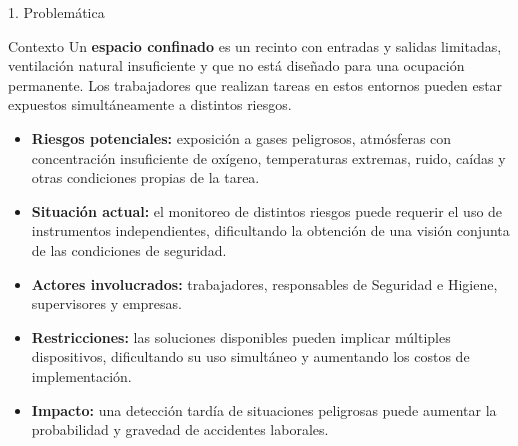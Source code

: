 \documentclass[10pt, aspectratio=169]{beamer}
\begin{document}
\begin{frame}{1. Problemática}

    \begin{block}{Contexto}
        Un \textbf{espacio confinado} es un recinto con entradas y salidas
        limitadas, ventilación natural insuficiente y que no está diseñado
        para una ocupación permanente. Los trabajadores que realizan tareas
        en estos entornos pueden estar expuestos simultáneamente a distintos
        riesgos.
    \end{block}

    \vspace{0.15cm}

    \begin{itemize}

        \item \textbf{Riesgos potenciales:}
        exposición a gases peligrosos, atmósferas con concentración
        insuficiente de oxígeno, temperaturas extremas, ruido,
        caídas y otras condiciones propias de la tarea.

        \vspace{0.10cm}

        \item \textbf{Situación actual:}
        el monitoreo de distintos riesgos puede requerir el uso de
        instrumentos independientes, dificultando la obtención de
        una visión conjunta de las condiciones de seguridad.

        \vspace{0.10cm}

        \item \textbf{Actores involucrados:}
        trabajadores, responsables de Seguridad e Higiene,
        supervisores y empresas.

        \vspace{0.10cm}

        \item \textbf{Restricciones:}
        las soluciones disponibles pueden implicar múltiples
        dispositivos, dificultando su uso simultáneo y aumentando
        los costos de implementación.

        \vspace{0.10cm}

        \item \textbf{Impacto:}
        una detección tardía de situaciones peligrosas puede aumentar
        la probabilidad y gravedad de accidentes laborales.

    \end{itemize}

\end{frame}
\end{document}
